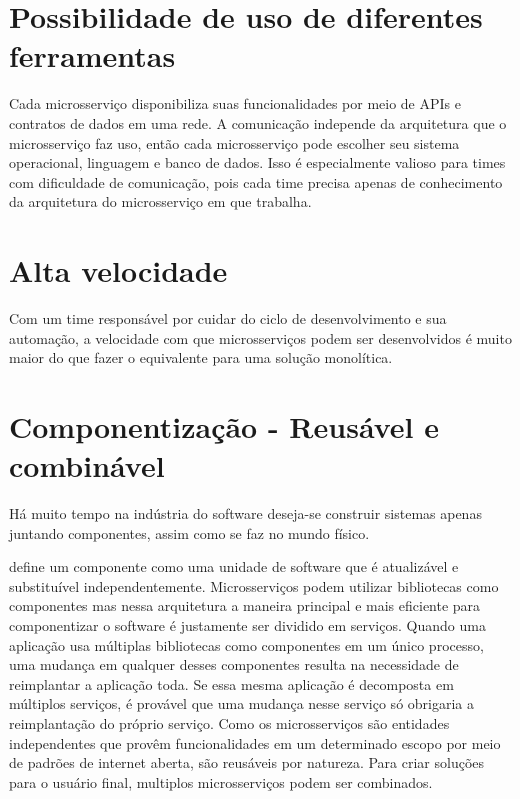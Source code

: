 \section{Possibilidade de uso de diferentes ferramentas}

Cada microsserviço disponibiliza suas funcionalidades por meio de APIs e contratos de dados em uma rede. A comunicação independe da arquitetura que o microsserviço faz uso, então cada microsserviço pode escolher seu sistema operacional, linguagem e banco de dados. Isso é especialmente valioso para times com dificuldade de comunicação, pois cada time precisa apenas de conhecimento da arquitetura do microsserviço em que trabalha. \cite{Familiar2015}

\section{Alta velocidade}

Com um time responsável por cuidar do ciclo de desenvolvimento e sua automação, a velocidade com que microsserviços podem ser desenvolvidos é muito maior do que fazer o equivalente para uma solução monolítica. \cite{Familiar2015}

\section{Componentização - Reusável e combinável}

Há muito tempo na indústria do software deseja-se construir sistemas apenas juntando componentes, assim como se faz no mundo físico.

 define um componente como uma unidade de software que é atualizável e substituível independentemente. Microsserviços podem utilizar bibliotecas como componentes mas nessa arquitetura a maneira principal e mais eficiente para componentizar o software é justamente ser dividido em serviços. Quando uma aplicação usa múltiplas bibliotecas como componentes em um único processo, uma mudança em qualquer desses componentes resulta na necessidade de reimplantar a aplicação toda. Se essa mesma aplicação é decomposta em múltiplos serviços, é provável que uma mudança nesse serviço só obrigaria a reimplantação do próprio serviço. Como os microsserviços são entidades independentes que provêm funcionalidades em um determinado escopo por meio de padrões de internet aberta, são reusáveis por natureza. Para criar soluções para o usuário final, multiplos microsserviços podem ser combinados. \cite{MartinFowlerMicroservices,Familiar2015}


